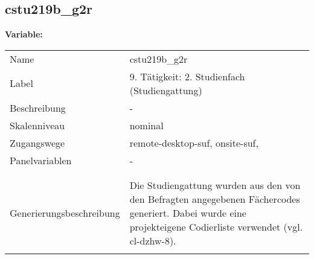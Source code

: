 	
	
	\subsection{cstu219b\_g2r}
	\label{subSection:cstu219b_g2r}

	\noindent\textbf{Variable:}\\
		\begin{tabular}{lL{11.3cm}}
			\label{tableVariable:cstu219b_g2r}
			Name & cstu219b\_g2r \\
			Label & 9. Tätigkeit: 2. Studienfach (Studiengattung) \\
			Beschreibung & - \\
			Skalenniveau & nominal \\
			Zugangswege &
				remote-desktop-suf,
				onsite-suf,
 \\
			Panelvariablen & -
			 \\
			 \\
 \\
					Generierungsbeschreibung & Die Studiengattung wurden aus den von den Befragten angegebenen Fächercodes generiert.  Dabei wurde eine projekteigene Codierliste verwendet (vgl. cl-dzhw-8).
				 \\	
			 \\
		\end{tabular}






